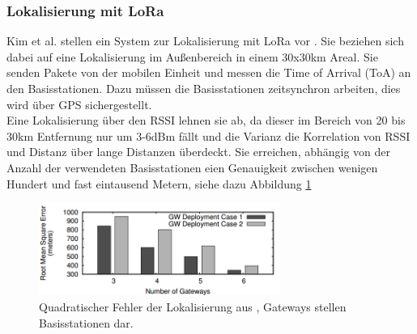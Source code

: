 \subsubsection{Lokalisierung mit LoRa}
Kim et al. stellen ein System zur Lokalisierung mit LoRa vor \cite{kim2016poster}.
Sie beziehen sich dabei auf eine Lokalisierung im Außenbereich in einem 30x30km Areal. 
Sie senden Pakete von der mobilen Einheit und messen die Time of Arrival (ToA) an den Basisstationen.
Dazu müssen die Basisstationen zeitsynchron arbeiten, dies wird über GPS sichergestellt.\\
Eine Lokalisierung über den RSSI lehnen sie ab, da dieser im Bereich von 20 bis 30km Entfernung nur um 3-6dBm fällt und die Varianz die Korrelation von RSSI und Distanz über lange Distanzen überdeckt.
Sie erreichen, abhängig von der Anzahl der verwendeten Basisstationen eien Genauigkeit zwischen wenigen Hundert und fast eintausend Metern, siehe dazu Abbildung \ref{fig:loraacc}

\begin{figure}[h]
  \centering
	\includegraphics[width=0.7\textwidth]{images/loraacc.png}
  \caption{Quadratischer Fehler der Lokalisierung aus \cite{kim2016poster}, Gateways stellen Basisstationen dar.}
  \label{fig:loraacc}
\end{figure}


